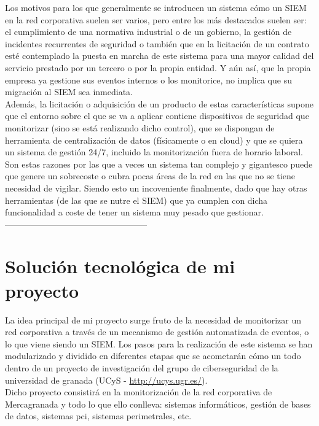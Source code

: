 Los motivos para los que generalmente se introducen un sistema cómo un SIEM en la red corporativa suelen ser varios, pero entre los más destacados suelen ser: el cumplimiento de una normativa industrial o de un gobierno, la gestión de incidentes recurrentes de seguridad o también que en la licitación de un contrato esté contemplado la puesta en marcha de este sistema para una mayor calidad del servicio prestado por un tercero o por la propia entidad. Y aún así, que la propia empresa ya gestione sus eventos internos o los monitorice, no implica que su migración al SIEM sea inmediata.\\

Además, la licitación o adquisición de un producto de estas características supone que el entorno sobre el que se va a aplicar contiene dispositivos de seguridad que monitorizar (sino se está realizando dicho control), que se dispongan de herramienta de centralización de datos (físicamente o en cloud) y que se quiera un sistema de gestión 24/7, incluido la monitorización fuera de horario laboral.\\

Son estas razones por las que a veces un sistema tan complejo y gigantesco puede que genere un sobrecoste o cubra pocas áreas de la red en las que no se tiene necesidad de vigilar. Siendo esto un incoveniente finalmente, dado que hay otras herramientas (de las que se nutre el SIEM) que ya cumplen con dicha funcionalidad a coste de tener un sistema muy pesado que gestionar.\\

--------------------------------------------------

\section{Solución tecnológica de mi proyecto}

La idea principal de mi proyecto surge fruto de la necesidad de monitorizar un red corporativa a través de un mecanismo de gestión automatizada de eventos, o lo que viene siendo un SIEM. Los pasos para la realización de este sistema se han modularizado y dividido en diferentes etapas que se acometarán cómo un todo dentro de un proyecto de investigación del grupo de ciberseguridad de la universidad de granada (UCyS - \url{http://ucys.ugr.es/}).\\

Dicho proyecto consistirá en la monitorización de la red corporativa de Mercagranada y todo lo que ello conlleva: sistemas informáticos, gestión de bases de datos, sistemas pci, sistemas perimetrales, etc. \\

